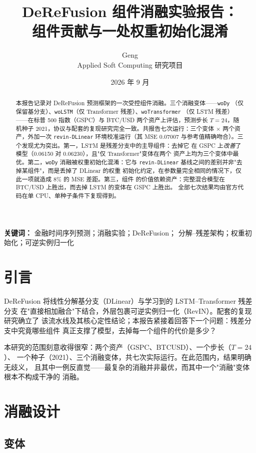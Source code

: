 \documentclass[11pt, a4paper]{ctexart}
\title{\textbf{DeReFusion 组件消融实验报告：\\组件贡献与一处权重初始化混淆}}
\author{Geng \\ \small Applied Soft Computing 研究项目}
\date{2026 年 9 月}
\begin{document}
\maketitle

\begin{abstract}
本报告记录对 DeReFusion 预测框架的一次受控组件消融。三个消融变体——\texttt{woDy}
（仅保留基分支）、\texttt{woLSTM}（仅 Transformer 残差）、\texttt{woTransformer}
（仅 LSTM 残差）——在标普 500 指数（GSPC）与 BTC/USD 两个资产上评估，预测步长
$T{=}24$，随机种子 2021，协议与配套的复现研究完全一致。共报告七次运行：三个变体
$\times$ 两个资产，外加一次 \texttt{revin-DLinear} 环境校准运行（其 MSE 0.07007
与参考值精确吻合）。三个发现尤为突出。第一，LSTM 是残差分支中的主导组件：去掉它
在 GSPC 上\emph{改善}了模型（0.06150 对 0.06230），且"仅 Transformer"变体在两个
资产上均为三个变体中最优。第二，\texttt{woDy} 消融被权重初始化混淆：它与
\texttt{revin-DLinear} 基线之间的差别并非"去掉某组件"，而是丢掉了 DLinear 的权重
初始化约定，在参数量完全相同的情况下，仅此一项就造成 8\% 的 MSE 差距。第三，组件
的价值依赖资产：完整混合模型在 BTC/USD 上胜出，而去掉 LSTM 的变体在 GSPC 上胜出。
全部七次结果均由官方代码在单 CPU、单种子条件下复现得到。
\end{abstract}

\noindent\textbf{关键词：} 金融时间序列预测；消融实验；DeReFusion；
分解--残差架构；权重初始化；可逆实例归一化

\section{引言}

DeReFusion 将线性分解基分支（DLinear）与学习到的 LSTM--Transformer 残差分支
在"直接相加融合"下结合，外层包裹可逆实例归一化（RevIN）。配套的复现研究确立了
该流水线及其核心定性结论；本报告紧接着回答下一个问题：残差分支中究竟哪些组件
真正支撑了模型，去掉每一个组件的代价是多少？

本研究的范围刻意收得很窄：两个资产（GSPC、BTCUSD）、一个步长（$T{=}24$）、
一个种子（2021）、三个消融变体，共七次实际运行。在此范围内，结果明确无歧义，
且其中一例反直觉——最复杂的消融并非最优，而其中一个"消融"变体根本不构成干净的
消融。

\section{消融设计}

\subsection{变体}
\end{document}
